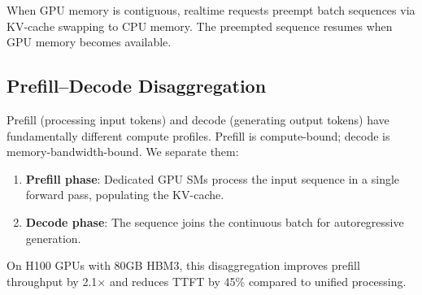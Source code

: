 When GPU memory is contiguous, realtime requests preempt batch sequences via
KV-cache swapping to CPU memory. The preempted sequence resumes when GPU memory
becomes available.

\subsection{Prefill--Decode Disaggregation}

Prefill (processing input tokens) and decode (generating output tokens) have
fundamentally different compute profiles. Prefill is compute-bound; decode is
memory-bandwidth-bound. We separate them:

\begin{enumerate}[leftmargin=1.4em]
    \item \textbf{Prefill phase}: Dedicated GPU SMs process the input sequence
    in a single forward pass, populating the KV-cache.
    \item \textbf{Decode phase}: The sequence joins the continuous batch for
    autoregressive generation.
\end{enumerate}

On H100 GPUs with 80GB HBM3, this disaggregation improves prefill throughput by
2.1$\times$ and reduces TTFT by 45\% compared to unified processing.


